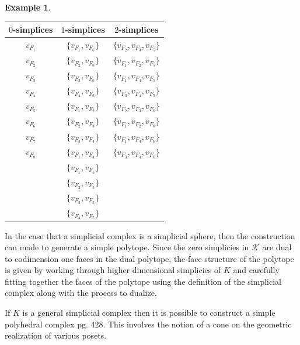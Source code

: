\documentclass[oneside,12pt]{amsart}
\theoremstyle{definition}
\newtheorem{Example}[Theorem]{Example}
\numberwithin{equation}{section}
\begin{document}
\begin{Example}
\begin{center}
\begin{tabular}{|c|c|c|}
\hline
$0$-simplices&$1$-simplices&$2$-simplices\\ \hline
$v_{F_1}$ & $\{v_{F_1}, v_{F_6}\}$   &  $\{v_{F_2}, v_{F_3}, v_{F_5}\}$ \\
$v_{F_2}$ &  $\{v_{F_2}, v_{F_6}\}$  &  $\{v_{F_1}, v_{F_2}, v_{F_5}\}$             \\
$v_{F_3}$ &  $\{v_{F_3}, v_{F_6}\}$  &  $\{v_{F_1}, v_{F_4}, v_{F_5}\}$           \\
$v_{F_4}$ &   $\{v_{F_4}, v_{F_6}\}$ &  $\{v_{F_3}, v_{F_4}, v_{F_5}\}$            \\
$v_{F_5}$ &   $\{v_{F_1}, v_{F_2}\}$ &   $\{v_{F_2}, v_{F_3}, v_{F_6}\}$          \\
$v_{F_6}$ & $\{v_{F_2}, v_{F_3}\}$   &  $\{v_{F_1}, v_{F_2}, v_{F_6}\}$              \\
$v_{F_7}$ & $\{v_{F_3}, v_{F_4}\}$   &  $\{v_{F_1}, v_{F_4}, v_{F_6}\}$               \\
$v_{F_8}$ & $\{v_{F_1}, v_{F_4}\}$   &   $\{v_{F_3}, v_{F_4}, v_{F_6}\}$              \\
          & $\{v_{F_1}, v_{F_5}\}$   &                   \\
          & $\{v_{F_2}, v_{F_5}\}$   &                   \\
          &  $\{v_{F_3}, v_{F_5}\}$  &                   \\
          &  $\{v_{F_4}, v_{F_5}\}$  &                  \\
\hline
\end{tabular}
\end{center}



\vspace{.1in}
\end{Example}

In the case that a simplicial complex is a simplicial sphere, then the construction can made to generate a simple polytope.  Since the zero simplicies in $\mathcal{K}$ are dual to codimension one faces in the dual polytope, the face structure of the polytope is given by working through higher dimensional simplicies of $K$ and carefully fitting together the faces of the polytope using the definition of the simplicial complex along with the process to dualize.

If $K$ is a general simplicial complex then it is possible to construct a simple polyhedral complex \cite{DJ} pg. 428. This involves the notion of a cone on the geometric realization of various posets.
\end{document}

